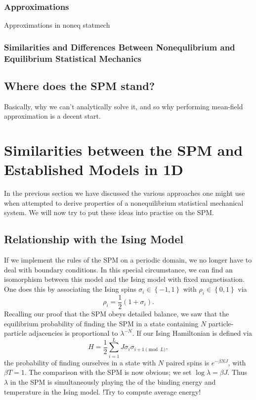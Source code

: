 \subsubsection{Approximations}

Approximations in noneq statmech  

\subsubsection{Similarities and Differences Between Nonequlibrium and Equilibrium Statistical Mechanics}

\subsection{Where does the SPM stand?}
Basically, why we can't analytically solve it, and so why performing mean-field approximation is a decent start.

\section{Similarities between the SPM and Established Models in 1D}
In the previous section we have discussed the various approaches one might use when attempted to derive properties of a nonequilibrium statistical mechanical system. We will now try to put these ideas into practise on the SPM.



\subsection{Relationship with the Ising Model}

If we implement the rules of the SPM on a periodic domain, we no longer have to deal with boundary conditions. In this special circumstance, we can find an isomorphism between this model and the Ising model with fixed magnetisation.
One does this by associating the Ising spins $\sigma_i \in \left\{-1, 1 \right\}$ with $\rho_i \in \left\{ 0, 1 \right\}$ via
\begin{equation}
 \rho_i = \frac{1}{2}\left(1+\sigma_i\right).
\end{equation}
Recalling our proof that the SPM obeys detailed balance, we saw that the equilibrium probability of finding the SPM in a state containing $N$ particle-particle adjacencies is proportional to $\lambda^{-N}$.
If our Ising Hamiltonian is defined via
\begin{equation}
 H = \frac{1}{2} \sum_{i=1}^L J \sigma_i \sigma_{i+1 \pmod L},
\end{equation}
the probability of finding ourselves in a state with $N$ paired spins is $e^{-\beta N J}$, with $\beta T =1$. The comparison with the SPM is now obvious; we set $\log{\lambda} = \beta J$. Thus $\lambda$ in the SPM is simultaneously playing the
of the binding energy and temperature in the Ising model.
!Try to compute average energy!


